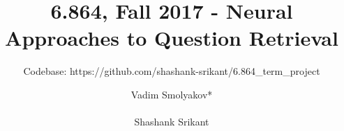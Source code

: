 \documentclass{sigkddExp}
\begin{document}
%

\title{6.864, Fall 2017 - Neural Approaches to Question Retrieval}
\subtitle{Codebase: https://github.com/shashank-srikant/6.864\_term\_project}

%

%


\author{
%
\alignauthor Vadim Smolyakov*\\
       \\
\alignauthor Shashank Srikant\\
       \\
}
\end{document}
